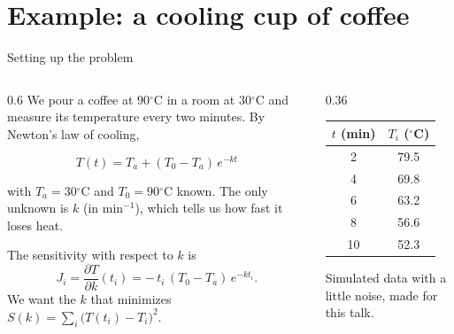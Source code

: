 \documentclass[aspectratio=169,10pt]{beamer}
\newcommand{\grados}{\ensuremath{^\circ}}
\begin{document}
\section{Example: a cooling cup of coffee}

\begin{frame}{Setting up the problem}
  \begin{columns}[T]
    \begin{column}{0.6\textwidth}
      We pour a coffee at $90\grados$C in a room at $30\grados$C and measure its temperature every two minutes. By Newton's law of cooling,
      \begin{ecuacion}
        \[ T(t) = T_a + (T_0 - T_a)\,e^{-k t} \]
      \end{ecuacion}
      with $T_a = 30\grados$C and $T_0 = 90\grados$C known. The only unknown is $k$ (in $\text{min}^{-1}$), which tells us how fast it loses heat.
      \medskip

      The sensitivity with respect to $k$ is
      \[ J_i = \frac{\partial T}{\partial k}(t_i) = -\,t_i\,(T_0 - T_a)\,e^{-k t_i} . \]
      We want the $k$ that minimizes $S(k) = \sum_i \big(T(t_i) - T_i\big)^2$.
    \end{column}
    \begin{column}{0.36\textwidth}
      \centering
      \begin{tabular}{cc}
        \toprule
        $t$ (min) & $T_i$ ($\grados$C) \\
        \midrule
        2  & 79.5 \\
        4  & 69.8 \\
        6  & 63.2 \\
        8  & 56.6 \\
        10 & 52.3 \\
        \bottomrule
      \end{tabular}
      \medskip

      {\scriptsize\color{gris}Simulated data with a little noise, made for this talk.}
    \end{column}
  \end{columns}
\end{frame}
\end{document}
